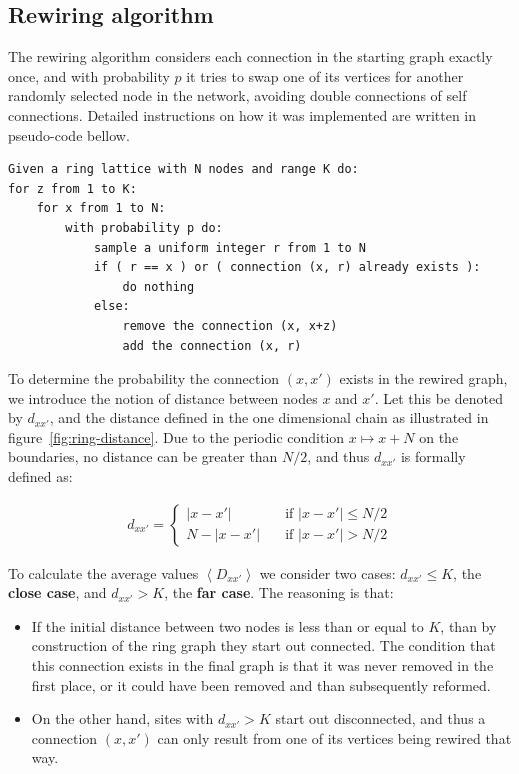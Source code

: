 \subsection{Rewiring algorithm}

The rewiring algorithm considers each connection in the starting graph exactly once, and with probability $p$ it tries to swap one of
its vertices for another randomly selected node in the network, avoiding double connections of self connections. Detailed instructions
on how it was implemented are written in pseudo-code bellow.

\noindent
\begin{minipage}{\linewidth}
\begin{lstlisting}
Given a ring lattice with N nodes and range K do:
for z from 1 to K:
    for x from 1 to N:
        with probability p do:
            sample a uniform integer r from 1 to N
            if ( r == x ) or ( connection (x, r) already exists ):
                do nothing
            else:
                remove the connection (x, x+z)
                add the connection (x, r)
\end{lstlisting}
\end{minipage}

To determine the probability the connection $(x, x')$ exists in the rewired graph, we introduce the notion of distance between nodes
$x$ and $x'$. Let this be denoted by $d_{xx'}$, and the distance defined in the one dimensional chain as illustrated in
figure~\ref{fig:ring-distance}. Due to the periodic condition $x \mapsto x+N$ on the boundaries, no distance can be greater than $N/2$,
and thus $d_{xx'}$ is formally defined as:

\begin{align}
    d_{xx'} =
    \begin{cases}
        |x-x'| \quad &\text{if $|x-x'|\leq N/2$} \\
        N-|x-x'| \quad &\text{if $|x-x'| > N/2$}
    \end{cases}
    \label{dist}
\end{align}

To calculate the average values $\left< D_{xx'} \right>$ we consider two cases: $d_{xx'} \leq K$, the \textbf{close case}, and $d_{xx'}
> K$, the \textbf{far case}. The reasoning is that:

\begin{itemize}
    \item If the initial distance between two nodes is less than or equal to $K$, than by construction of the ring graph they start out
        connected. The condition that this connection exists in the final graph is that it was never removed in the first place, or it
        could have been removed and than subsequently reformed.

    \item On the other hand, sites with $d_{xx'}>K$ start out disconnected, and thus a connection $(x,x')$ can only result from one of
        its vertices being rewired that way.
\end{itemize}

